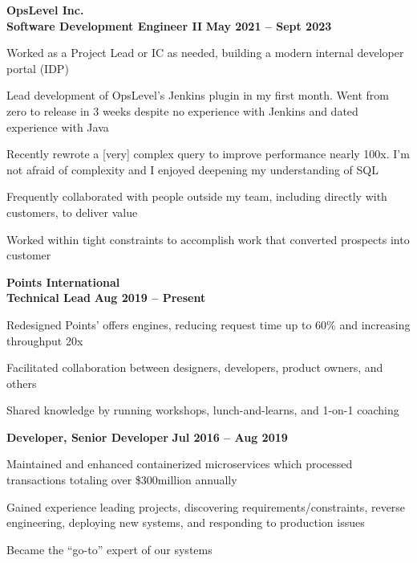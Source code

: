 \documentclass[margin,line]{resume}
\begin{document}
\begin{resume}
    \hspace{-3mm}\textbf{\listing OpsLevel Inc.} \vspace{2mm}\\\vspace{1mm}
    \hspace{1.2mm}\textbf{Software Development Engineer II} \hfill \textbf{May 2021 -- Sept 2023}\vspace{1mm}
    \begin{list2}
        \item Worked as a Project Lead or IC as needed, building a modern internal developer portal (IDP)
        \item Lead development of OpsLevel's Jenkins plugin in my first month. Went from zero to release in 3 weeks despite no experience with Jenkins and dated experience with Java
        \item Recently rewrote a [very] complex query to improve performance nearly 100x. I'm not afraid of complexity and I enjoyed deepening my understanding of SQL
        \item Frequently collaborated with people outside my team, including directly with customers, to deliver value
        \item Worked within tight constraints to accomplish work that converted prospects into customer
    \end{list2}

    \hspace{-3mm}\textbf{\listing Points International} \vspace{2mm}\\\vspace{1mm}
    \hspace{1.2mm}\textbf{Technical Lead} \hfill \textbf{Aug 2019 -- Present}\vspace{1mm}
    \begin{list2}
        \item Redesigned Points’ offers engines, reducing request time up to 60\% and increasing throughput 20x
        \item Facilitated collaboration between designers, developers, product owners, and others
        \item Shared knowledge by running workshops, lunch-and-learns, and 1-on-1 coaching
    \end{list2}

    \hspace{2.6mm}\textbf{Developer, Senior Developer} \hfill \textbf{Jul 2016 -- Aug 2019}\vspace{1mm}
    \begin{list2}
        \item Maintained and enhanced containerized microservices which processed transactions totaling over \$300million annually
        \item Gained experience leading projects, discovering requirements/constraints, reverse engineering, deploying new systems, and responding to production issues
        \item Became the “go-to” expert of our systems
    \end{list2}


\end{resume}
\end{document}
